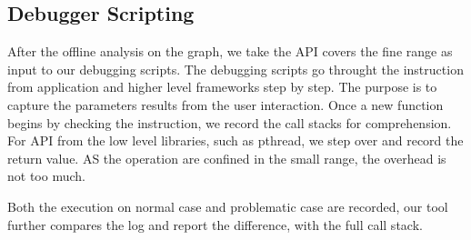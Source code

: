 \subsection{Debugger Scripting}
After the offline analysis on the graph, we take the API covers the fine range as input to our debugging scripts.
The debugging scripts go throught the instruction from application and higher level frameworks step by step.
The purpose is to capture the parameters results from the user interaction.
Once a new function begins by checking the instruction, we record the call stacks for comprehension. 
For API from the low level libraries, such as pthread, we step over and record the return value.
AS the operation are confined in the small range, the overhead is not too much.

Both the execution on normal case and problematic case are recorded, our tool further compares the log and report
the difference, with the full call stack.
